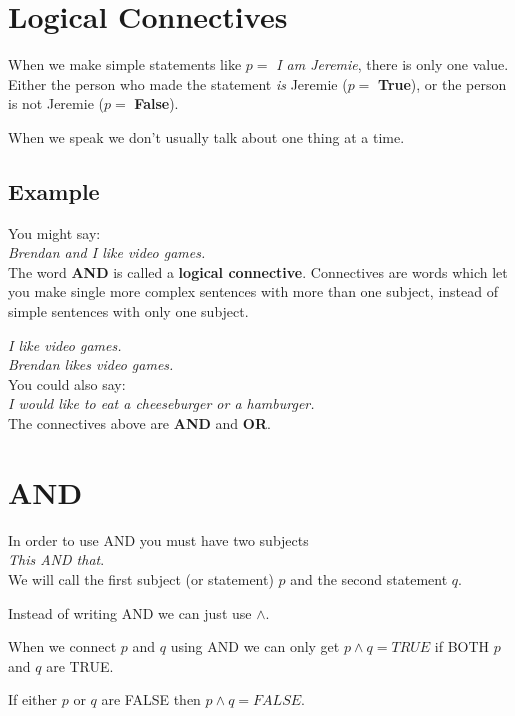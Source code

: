 \documentclass{article}
\newcommand{\sv}[1]{\ensuremath{\mathit{#1}}}
\begin{document}
\section*{Logical Connectives}

When we make simple statements like $\mathit{p} = $ \textit{I am Jeremie}, there is only one value. Either the person who made the statement \textit{is} Jeremie ($\mathit{p} = $ \textbf{True}), or the person is not Jeremie ($\mathit{p} = $ \textbf{False}).

When we speak we don't usually talk about one thing at a time. 

\subsection*{Example}

You might say: \\
\textit{Brendan and I like video games.} \\

\bigskip
The word \textbf{AND} is called a \textbf{logical connective}. Connectives are words which let you make single more complex sentences with more than one subject, instead of simple sentences with only one subject. 

\medskip
\textit{I like video games.} \\
\textit{Brendan likes video games.} \\

You could also say: \\
\textit{I would like to eat a cheeseburger or a hamburger.} \\

The connectives above are \textbf{AND} and \textbf{OR}.


\section*{AND}
In order to use AND you must have two subjects \\
\textit{This AND that}. \\

We will call the first subject (or statement) \sv{p} and the second statement \sv{q}. 

Instead of writing AND we can just use $\wedge$. 

When we connect \sv{p} and \sv{q} using AND we can only get $p \wedge q = TRUE$ if BOTH \sv{p} and \sv{q} are TRUE. 


If either \sv{p} or \sv{q} are FALSE then $p \wedge q = FALSE$. 
\end{document}
